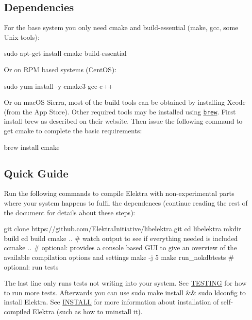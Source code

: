 \subsection*{Dependencies}

For the base system you only need cmake and build-\/essential (make, gcc, some Unix tools)\+: \begin{DoxyVerb}    sudo apt-get install cmake build-essential
\end{DoxyVerb}


Or on R\+PM based systems (Cent\+OS)\+: \begin{DoxyVerb}    sudo yum install -y cmake3 gcc-c++
\end{DoxyVerb}


Or on mac\+OS Sierra, most of the build tools can be obtained by installing Xcode (from the App Store). Other required tools may be installed using \href{http://brew.sh/}{\tt brew}. First install brew as described on their website. Then issue the following command to get cmake to complete the basic requirements\+: \begin{DoxyVerb}    brew install cmake
\end{DoxyVerb}


\subsection*{Quick Guide}

Run the following commands to compile Elektra with non-\/experimental parts where your system happens to fulfil the dependences (continue reading the rest of the document for details about these steps)\+:


\begin{DoxyCode}
git clone https://github.com/ElektraInitiative/libelektra.git
cd libelektra
mkdir build
cd build
cmake ..  # watch output to see if everything needed is included
ccmake .. # optional: provides a console based GUI to give an overview of the available compilation options
       and settings
make -j 5
make run\_nokdbtests  # optional: run tests
\end{DoxyCode}


The last line only runs tests not writing into your system. See \hyperlink{doc_TESTING_md}{T\+E\+S\+T\+I\+NG} for how to run more tests. Afterwards you can use {\ttfamily sudo make install \&\& sudo ldconfig} to install Elektra. See \hyperlink{doc_INSTALL_md}{I\+N\+S\+T\+A\+LL} for more information about installation of self-\/compiled Elektra (such as how to uninstall it).

